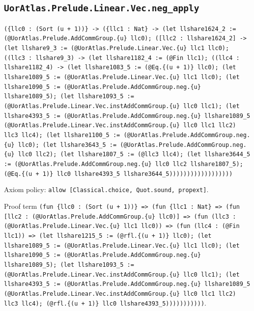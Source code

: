 \documentclass[11pt]{article}
\begin{document}
\subsection*{\texttt{UorAtlas.Prelude.Linear.Vec.neg\_apply}}
\noindent\texttt{(\{llc0 : (Sort (u + 1))\} -> (\{llc1 : Nat\} -> (let llshare1624\_2 := (@UorAtlas.Prelude.AddCommGroup.\{u\} llc0); ([llc2 : llshare1624\_2] -> (let llshare9\_3 := (@UorAtlas.Prelude.Linear.Vec.\{u\} llc1 llc0); ((llc3 : llshare9\_3) -> (let llshare1182\_4 := (@Fin llc1); ((llc4 : llshare1182\_4) -> (let llshare1083\_5 := (@Eq.\{(u + 1)\} llc0); (let llshare1089\_5 := (@UorAtlas.Prelude.Linear.Vec.\{u\} llc1 llc0); (let llshare1090\_5 := (@UorAtlas.Prelude.AddCommGroup.neg.\{u\} llshare1089\_5); (let llshare1093\_5 := (@UorAtlas.Prelude.Linear.Vec.instAddCommGroup.\{u\} llc0 llc1); (let llshare4393\_5 := (@UorAtlas.Prelude.AddCommGroup.neg.\{u\} llshare1089\_5 (@UorAtlas.Prelude.Linear.Vec.instAddCommGroup.\{u\} llc0 llc1 llc2) llc3 llc4); (let llshare1100\_5 := (@UorAtlas.Prelude.AddCommGroup.neg.\{u\} llc0); (let llshare3643\_5 := (@UorAtlas.Prelude.AddCommGroup.neg.\{u\} llc0 llc2); (let llshare1807\_5 := (@llc3 llc4); (let llshare3644\_5 := (@UorAtlas.Prelude.AddCommGroup.neg.\{u\} llc0 llc2 llshare1807\_5); (@Eq.\{(u + 1)\} llc0 llshare4393\_5 llshare3644\_5))))))))))))))))))}\par
\noindent Axiom policy: \texttt{allow [Classical.choice, Quot.sound, propext]}.\par
\noindent Proof term \texttt{(fun \{llc0 : (Sort (u + 1))\} => (fun \{llc1 : Nat\} => (fun [llc2 : (@UorAtlas.Prelude.AddCommGroup.\{u\} llc0)] => (fun (llc3 : (@UorAtlas.Prelude.Linear.Vec.\{u\} llc1 llc0)) => (fun (llc4 : (@Fin llc1)) => (let llshare1215\_5 := (@rfl.\{(u + 1)\} llc0); (let llshare1089\_5 := (@UorAtlas.Prelude.Linear.Vec.\{u\} llc1 llc0); (let llshare1090\_5 := (@UorAtlas.Prelude.AddCommGroup.neg.\{u\} llshare1089\_5); (let llshare1093\_5 := (@UorAtlas.Prelude.Linear.Vec.instAddCommGroup.\{u\} llc0 llc1); (let llshare4393\_5 := (@UorAtlas.Prelude.AddCommGroup.neg.\{u\} llshare1089\_5 (@UorAtlas.Prelude.Linear.Vec.instAddCommGroup.\{u\} llc0 llc1 llc2) llc3 llc4); (@rfl.\{(u + 1)\} llc0 llshare4393\_5)))))))))))}.\par
\end{document}
